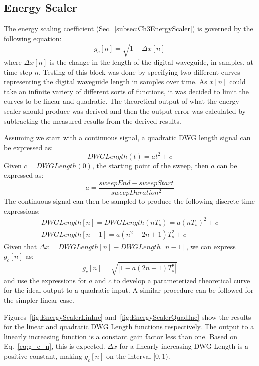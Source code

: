 \documentclass[../main.tex]{subfiles}
\begin{document}
\subsection{Energy Scaler}
The energy scaling coefficient (Sec.~\ref{subsec:Ch3EnergyScaler}) is governed by the following equation:
\begin{equation}
\label{eq:g_c_n}
    g_c[n] = \sqrt{1-\Delta x[n]}
\end{equation}
where $\Delta x[n]$ is the change in the length of the digital waveguide, in samples, at time-step $n$. Testing of this block was done by specifying two different curves representing the digital waveguide length in samples over time. As $x[n]$ could take an infinite variety of different sorts of functions, it was decided to limit the curves to be linear and quadratic. The theoretical output of what the energy scaler should produce was derived and then the output error was calculated by subtracting the measured results from the derived results.

Assuming we start with a continuous signal, a quadratic DWG length signal can be expressed as:
\begin{equation}
    DWGLength(t) = at^2 + c 
\end{equation}
Given $c = DWGLength(0)$,  the starting point of the sweep, then $a$ can be expressed as:
\begin{equation}
    a = \frac{sweepEnd - sweepStart}{sweepDuration^2}
\end{equation}
The continuous signal can then be sampled to produce the following discrete-time expressions:
\begin{align}
    DWGLength[n] = DWGLength(nT_s) = a(nT_s)^2 + c\\
    DWGLength[n-1] = a(n^2 - 2n + 1)T_s^2 + c
\end{align}
Given that $\Delta x = DWGLength[n] - DWGLength[n-1]$, we can express $g_c[n]$ as:
\begin{equation}
    g_c[n] = \sqrt{|1-a(2n-1)T_s^2|}
\end{equation}
and use the expressions for $a$ and $c$ to develop a parameterized theoretical curve for the ideal output to a quadratic input. A similar procedure can be followed for the simpler linear case.

Figures~\ref{fig:EnergyScalerLinInc} and~\ref{fig:EnergyScalerQuadInc} show the results for the linear and quadratic DWG Length functions respectively. The output to a linearly increasing function is a constant gain factor less than one. Based on Eq.~\ref{eq:g_c_n}, this is expected. $\Delta x$ for a linearly increasing DWG Length is a positive constant, making $g_c[n]$ on the interval $[0, 1)$. 
\end{document}

